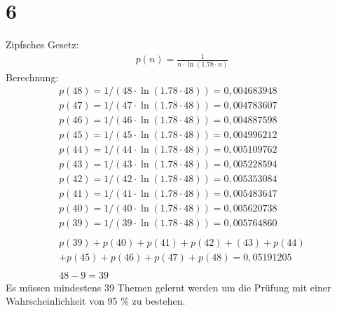 \documentclass[ngerman]{scrartcl}
\begin{document}
\section*{6}
	Zipfsches Gesetz:
	\begin{align*}
		p(n) = \frac{1}{n \cdot \ln(1.78 \cdot n) }
	\end{align*}
	Berechnung:
	\begin{align*}
	p(48) = 1/(48 \cdot \ln(1.78 \cdot 48)) = 0,004683948 \\
	p(47) = 1/(47 \cdot \ln(1.78 \cdot 48)) = 0,004783607 \\
	p(46) = 1/(46 \cdot \ln(1.78 \cdot 48)) = 0,004887598 \\
	p(45) = 1/(45 \cdot \ln(1.78 \cdot 48)) = 0,004996212 \\
	p(44) = 1/(44 \cdot \ln(1.78 \cdot 48)) = 0,005109762 \\
	p(43) = 1/(43 \cdot \ln(1.78 \cdot 48)) = 0,005228594 \\
	p(42) = 1/(42 \cdot \ln(1.78 \cdot 48)) = 0,005353084 \\
	p(41) = 1/(41 \cdot \ln(1.78 \cdot 48)) = 0,005483647 \\
	p(40) = 1/(40 \cdot \ln(1.78 \cdot 48)) = 0,005620738 \\
	p(39) = 1/(39 \cdot \ln(1.78 \cdot 48)) = 0,005764860  \\
	\\
	p(39)+p(40)+p(41)+p(42)+(43)+p(44) \\
	+p(45)+p(46)+p(47)+p(48) = 0,05191205 \\
	\\
	48 - 9 = 39	
	\end{align*}
	Es müssen mindestens 39 Themen gelernt werden um die Prüfung mit einer Wahrscheinlichkeit von 95 \% zu bestehen.
	
\end{document}
